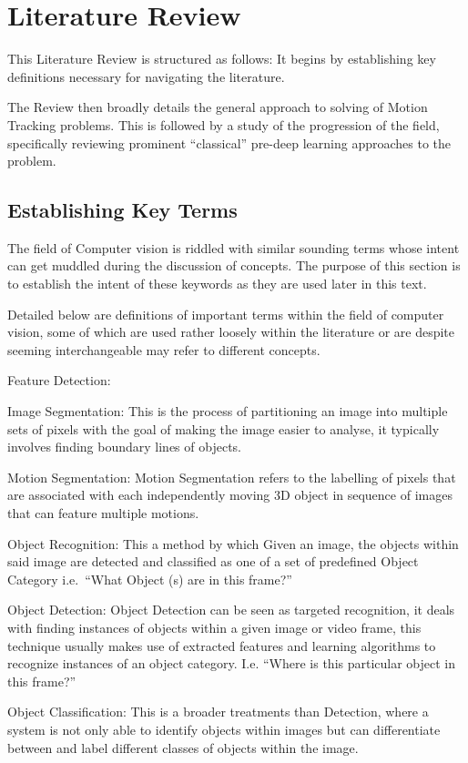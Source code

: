 \chapter{Literature Review}\label{chapter_literature_review}
This Literature Review is structured as follows: It begins by establishing key
definitions necessary for navigating the literature.

The Review then broadly details the general approach to solving of Motion Tracking
problems. This is followed by a study of the progression of the field,
specifically reviewing prominent “classical” pre-deep learning approaches to the
problem.

\section{Establishing Key Terms}
The field of Computer vision is riddled with similar sounding terms whose intent
can get muddled during the discussion of concepts.  The purpose of this section
is to establish the intent of these keywords as they are used later in this text.

Detailed below are definitions of important terms within the field of computer
vision, some of which are used rather loosely within the literature or are
despite seeming interchangeable may refer to different concepts. 

Feature Detection:

Image Segmentation: This is the process of partitioning an image into multiple
sets of pixels with the goal of making the image easier to analyse, it typically
involves finding boundary lines of objects. 

Motion Segmentation: Motion Segmentation refers to the labelling of pixels that
are associated with each independently moving 3D object in sequence of images
that can feature multiple motions.~\cite{Tekalp2014}

Object Recognition: This a method by which Given an image, the objects within
said image are detected and classified as one of a set of predefined Object
Category i.e.\ ``What Object (s) are in this frame?''

Object Detection: Object Detection can be seen as targeted recognition, it deals
with finding instances of objects within a given image or video frame, this
technique usually makes use of extracted features and learning algorithms to
recognize instances of an object category.  I.e. “Where is this particular
object in this frame?”

Object Classification: This is a broader treatments than Detection, where a
system is not only able to identify objects within images but can differentiate
between and label different classes of objects within the image. 

